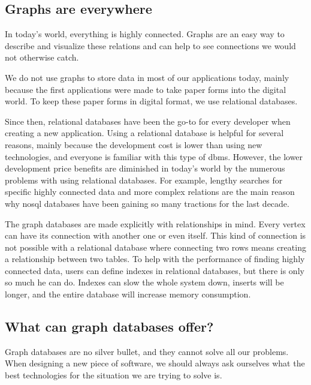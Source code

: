 \begin{introduction}

    \section{Graphs are everywhere}

    In today's world, everything is highly connected.
    Graphs are an easy way to describe and visualize these relations and can help to see connections we would not otherwise catch.

    We do not use graphs to store data in most of our applications today, mainly because the first applications were made to take paper forms into the digital world.
    To keep these paper forms in digital format, we use relational databases.

    Since then, relational databases have been the go-to for every developer when creating a new application.
    Using a relational database is helpful for several reasons, mainly because the development cost is lower than using new technologies, and everyone is familiar with this type of \acrshort{dbms}.
    However, the lower development price benefits are diminished in today's world by the numerous problems with using relational databases.
    For example, lengthy searches for specific highly connected data and more complex relations are the main reason why \Gls{nosql} databases have been gaining so many tractions for the last decade.

    The graph databases are made explicitly with relationships in mind.
    Every vertex can have its connection with another one or even itself.
    This kind of connection is not possible with a relational database where connecting two rows means creating a relationship between two tables.
    To help with the performance of finding highly connected data, users can define indexes in relational databases, but there is only so much he can do.
    Indexes can slow the whole system down, inserts will be longer, and the entire database will increase memory consumption.

    \subsection{What can graph databases offer?}

    Graph databases are no silver bullet, and they cannot solve all our problems.
    When designing a new piece of software, we should always ask ourselves what the best technologies for the situation we are trying to solve is.


\end{introduction}
